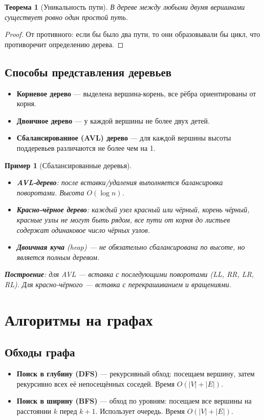 \documentclass[12pt]{article}
\newtheorem{theorem}{Теорема}
\newtheorem{example}{Пример}
\begin{document}
\begin{enumerate}
\begin{theorem}[Уникальность пути]
    В дереве между любыми двумя вершинами существует ровно один простой путь.
\end{theorem}
\begin{proof}
    От противного: если бы было два пути, то они образовывали бы цикл, что противоречит определению дерева.
\end{proof}

\subsection{Способы представления деревьев}
\begin{itemize}
    \item \textbf{Корневое дерево} — выделена вершина-корень, все рёбра ориентированы от корня.
    \item \textbf{Двоичное дерево} — у каждой вершины не более двух детей.
    \item \textbf{Сбалансированное (AVL) дерево} — для каждой вершины высоты поддеревьев различаются не более чем на 1.
\end{itemize}

\begin{example}[Сбалансированные деревья]
    \begin{itemize}
        \item \textbf{AVL-дерево}: после вставки/удаления выполняется балансировка поворотами. Высота \(O(\log n)\).
        \item \textbf{Красно-чёрное дерево}: каждый узел красный или чёрный, корень чёрный, красные узлы не могут быть рядом, все пути от корня до листьев содержат одинаковое число чёрных узлов.
        \item \textbf{Двоичная куча} (heap) — не обязательно сбалансирована по высоте, но является полным деревом.
    \end{itemize}
    \textbf{Построение}: для AVL — вставка с последующими поворотами (LL, RR, LR, RL). Для красно-чёрного — вставка с перекрашиванием и вращениями.
\end{example}

\section{Алгоритмы на графах}
\subsection{Обходы графа}
\begin{itemize}
    \item \textbf{Поиск в глубину (DFS)} — рекурсивный обход: посещаем вершину, затем рекурсивно всех её непосещённых соседей. Время \(O(|V| + |E|)\).
    \item \textbf{Поиск в ширину (BFS)} — обход по уровням: посещаем все вершины на расстоянии \(k\) перед \(k+1\). Использует очередь. Время \(O(|V| + |E|)\).
\end{itemize}


\end{enumerate}
\end{document}
